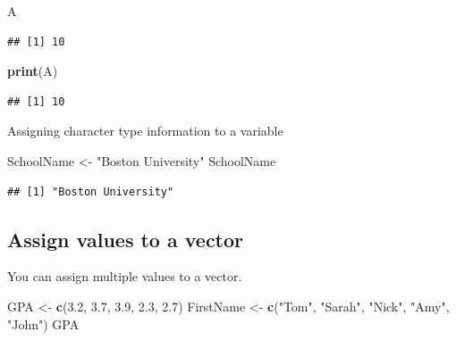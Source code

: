 \documentclass[
]{article}
\newenvironment{Shaded}{\begin{snugshade}}{\end{snugshade}}
\newcommand{\FloatTok}[1]{\textcolor[rgb]{0.00,0.00,0.81}{#1}}
\newcommand{\FunctionTok}[1]{\textcolor[rgb]{0.13,0.29,0.53}{\textbf{#1}}}
\newcommand{\NormalTok}[1]{#1}
\newcommand{\OtherTok}[1]{\textcolor[rgb]{0.56,0.35,0.01}{#1}}
\newcommand{\StringTok}[1]{\textcolor[rgb]{0.31,0.60,0.02}{#1}}
\begin{document}
\begin{Shaded}
\begin{Highlighting}[]
\NormalTok{A}
\end{Highlighting}
\end{Shaded}

\begin{verbatim}
## [1] 10
\end{verbatim}

\begin{Shaded}
\begin{Highlighting}[]
\FunctionTok{print}\NormalTok{(A)}
\end{Highlighting}
\end{Shaded}

\begin{verbatim}
## [1] 10
\end{verbatim}

Assigning character type information to a variable

\begin{Shaded}
\begin{Highlighting}[]
\NormalTok{SchoolName }\OtherTok{\textless{}{-}} \StringTok{"Boston University"}
\NormalTok{SchoolName}
\end{Highlighting}
\end{Shaded}

\begin{verbatim}
## [1] "Boston University"
\end{verbatim}

\subsection{Assign values to a vector}\label{assign-values-to-a-vector}

You can assign multiple values to a vector.

\begin{Shaded}
\begin{Highlighting}[]
\NormalTok{GPA }\OtherTok{\textless{}{-}} \FunctionTok{c}\NormalTok{(}\FloatTok{3.2}\NormalTok{, }\FloatTok{3.7}\NormalTok{, }\FloatTok{3.9}\NormalTok{, }\FloatTok{2.3}\NormalTok{, }\FloatTok{2.7}\NormalTok{)}
\NormalTok{FirstName }\OtherTok{\textless{}{-}} \FunctionTok{c}\NormalTok{(}\StringTok{"Tom"}\NormalTok{, }\StringTok{"Sarah"}\NormalTok{, }\StringTok{"Nick"}\NormalTok{, }\StringTok{"Amy"}\NormalTok{, }\StringTok{"John"}\NormalTok{)}
\NormalTok{GPA}
\end{Highlighting}
\end{Shaded}
\end{document}
